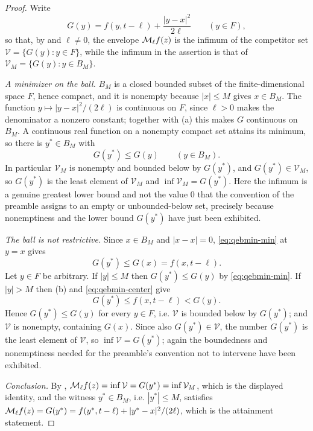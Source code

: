 \begin{proof}
Write
\[
  G(y)=f(y,t-\ell)+\frac{|y-x|^2}{2\ell}\qquad(y\in F),
\]
so that, by  and $\ell\ne0$, the envelope $\mathcal{M}_\ell f(z)$ is
the infimum of the competitor set $\mathcal V=\{G(y):y\in F\}$, while the infimum
in the assertion is that of $\mathcal V_M=\{G(y):y\in B_M\}$.

\emph{A minimizer on the ball.}
$B_M$ is a closed bounded subset of the finite-dimensional space $F$, hence
compact, and it is nonempty because $|x|\le M$ gives $x\in B_M$. The function
$y\mapsto|y-x|^2/(2\ell)$ is continuous on $F$, since $\ell>0$ makes the
denominator a nonzero constant; together with (a) this makes $G$ continuous on
$B_M$. A continuous real function on a nonempty compact set attains its minimum,
so there is $y^\ast\in B_M$ with
\begin{equation}\label{eq:qebmin-min}
  G(y^\ast)\le G(y)\qquad(y\in B_M).
\end{equation}
In particular $\mathcal V_M$ is nonempty and bounded below by $G(y^\ast)$, and
$G(y^\ast)\in\mathcal V_M$, so $G(y^\ast)$ is the least element of $\mathcal V_M$
and $\inf\mathcal V_M=G(y^\ast)$. Here the infimum is a genuine greatest lower
bound and not the value $0$ that the convention of the preamble assigns to an
empty or unbounded-below set, precisely because nonemptiness and the lower bound
$G(y^\ast)$ have just been exhibited.

\emph{The ball is not restrictive.}
Since $x\in B_M$ and $|x-x|=0$, \eqref{eq:qebmin-min} at $y=x$ gives
\begin{equation}\label{eq:qebmin-center}
  G(y^\ast)\le G(x)=f(x,t-\ell).
\end{equation}
Let $y\in F$ be arbitrary. If $|y|\le M$ then $G(y^\ast)\le G(y)$ by
\eqref{eq:qebmin-min}. If $|y|>M$ then (b) and \eqref{eq:qebmin-center} give
\[
  G(y^\ast)\le f(x,t-\ell)<G(y).
\]
Hence $G(y^\ast)\le G(y)$ for every $y\in F$, i.e. $\mathcal V$ is bounded below
by $G(y^\ast)$; and $\mathcal V$ is nonempty, containing $G(x)$. Since also
$G(y^\ast)\in\mathcal V$, the number $G(y^\ast)$ is the least element of
$\mathcal V$, so $\inf\mathcal V=G(y^\ast)$; again the boundedness and
nonemptiness needed for the preamble's convention not to intervene have been
exhibited.

\emph{Conclusion.}
By , $\mathcal{M}_\ell f(z)=\inf\mathcal V=G(y^\ast)
=\inf\mathcal V_M$, which is the displayed identity, and the witness
$y^\ast\in B_M$, i.e. $|y^\ast|\le M$, satisfies
$\mathcal{M}_\ell f(z)=G(y^\ast)=f(y^\ast,t-\ell)+|y^\ast-x|^2/(2\ell)$, which is the
attainment statement.
\end{proof}
